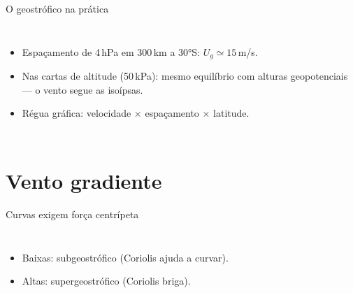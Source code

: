 \documentclass[aspectratio=169,11pt]{beamer}
\begin{document}
\begin{frame}{O geostrófico na prática}
  \begin{columns}
    \begin{itemize}
      \item Espaçamento de 4\,hPa em 300\,km a $30°$S:
            $U_g \simeq 15$\,m/s.
      \item Nas cartas de altitude (50\,kPa): mesmo equilíbrio com
            alturas geopotenciais — o vento segue as isoípsas.
      \item Régua gráfica: velocidade × espaçamento × latitude.
    \end{itemize}
  \end{columns}
\end{frame}

\section{Vento gradiente}

\begin{frame}{Curvas exigem força centrípeta}
  \begin{columns}
    \vspace{0.4em}
    \begin{itemize}
      \item Baixas: subgeostrófico (Coriolis ajuda a curvar).
      \item Altas: supergeostrófico (Coriolis briga).
    \end{itemize}
  \end{columns}
\end{frame}
\end{document}

